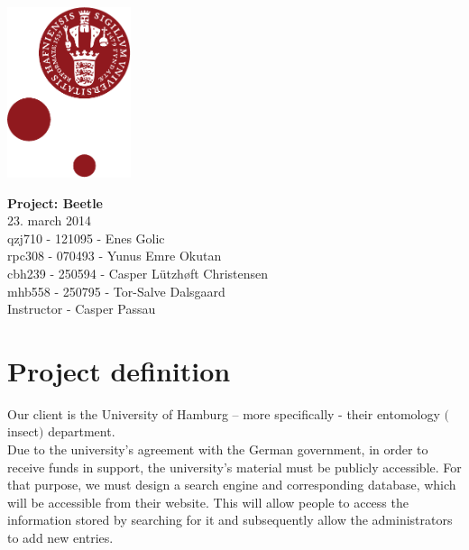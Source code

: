 \documentclass[12pt,a4paper]{article}
\begin{document}
	
	\begin{minipage}[b]{1.0\linewidth} 
		\includegraphics[height=50mm]{KULogo.pdf}
		
		\vspace*{-16ex}
		\vspace {35ex}
		\begin{center}
			{\huge \bf Project: Beetle} \vspace*{4ex} \\
			{\large 23. march 2014}\\
			\vspace*{2ex}
			qzj710 - 121095 - Enes Golic \\
			rpc308 - 070493 - Yunus Emre Okutan \\
			cbh239 - 250594 - Casper Lützhøft Christensen \\
			mhb558 - 250795 - Tor-Salve Dalsgaard\\
			\vspace*{1ex}
			Instructor - Casper Passau
			
		\end{center}
	\end{minipage}
	
\newpage
\section{Project definition}
Our client is the University of Hamburg – more specifically - their entomology $($insect$)$ department.\\
Due to the university’s agreement with the German government, in order to receive funds in support, the university’s material must be publicly accessible. For that purpose, we must design a search engine and corresponding database, which will be accessible from their website. This will allow people to access the information stored by searching for it and subsequently allow the administrators to add new entries.\\ 
\end{document}
